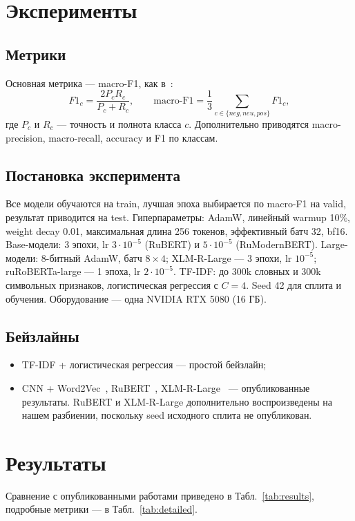 \documentclass{article}
\begin{document}
\section{Эксперименты}
\subsection{Метрики}
Основная метрика --- macro-F1, как в~\cite{smetanin2019rureviews,smetanin2021deep}:
$$F1_c = \frac{2P_cR_c}{P_c+R_c},\qquad \text{macro-F1} = \frac{1}{3}\sum_{c\in\{neg,neu,pos\}} F1_c,$$
где $P_c$ и $R_c$ --- точность и полнота класса $c$. Дополнительно приводятся macro-precision, macro-recall, accuracy и F1 по классам.

\subsection{Постановка эксперимента}
Все модели обучаются на train, лучшая эпоха выбирается по macro-F1 на valid, результат приводится на test. Гиперпараметры: AdamW, линейный warmup 10\%, weight decay 0.01, максимальная длина 256 токенов, эффективный батч 32, bf16. Base-модели: 3 эпохи, lr $3\cdot10^{-5}$ (RuBERT) и $5\cdot10^{-5}$ (RuModernBERT). Large-модели: 8-битный AdamW, батч $8\times4$; XLM-R-Large --- 3 эпохи, lr $10^{-5}$; ruRoBERTa-large --- 1 эпоха, lr $2\cdot10^{-5}$. TF-IDF: до 300k словных и 300k символьных признаков, логистическая регрессия с $C=4$. Seed 42 для сплита и обучения. Оборудование --- одна NVIDIA RTX 5080 (16 ГБ).

\subsection{Бейзлайны}
\begin{itemize}
    \item TF-IDF + логистическая регрессия --- простой бейзлайн;
    \item CNN + Word2Vec~\cite{smetanin2019rureviews}, RuBERT~\cite{smetanin2021deep}, XLM-R-Large~\cite{smetanin2022transformers} --- опубликованные результаты. RuBERT и XLM-R-Large дополнительно воспроизведены на нашем разбиении, поскольку seed исходного сплита не опубликован.
\end{itemize}

\section{Результаты}
Сравнение с опубликованными работами приведено в Табл.~\ref{tab:results}, подробные метрики --- в Табл.~\ref{tab:detailed}.
\end{document}

